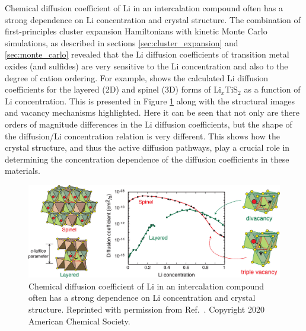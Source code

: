 \documentclass[../main.tex]{subfiles}
\begin{document}
Chemical diffusion coefficient of Li in an intercalation compound often has a strong dependence on Li concentration and crystal structure. The combination of first-principles cluster expansion Hamiltonians with kinetic Monte Carlo simulations, as described in sections \ref{sec:cluster_expansion} and \ref{sec:monte_carlo} revealed that the Li diffusion coefficients of transition metal oxides (and sulfides) are very sensitive to the Li concentration and also to the degree of cation ordering. \cite{van2008nondilute,VanderVen2001, bhattacharya2011first, bhattacharya2010phase, VanDerVen2013} For example, \citeauthor{VanderVen2020} shows the calculated Li diffusion coefficients for the layered (2D) and spinel (3D) forms of Li$_x$TiS$_2$ as a function of Li concentration. \cite{VanderVen2020,VanDerVen2013,van2008nondilute,bhattacharya2011first} This is presented in Figure \ref{fig:LixTiS2_diffusion} along with the structural images and vacancy mechanisms highlighted. Here it can be seen that not only are there orders of magnitude differences in the Li diffusion coefficients, but the shape of the diffusion/Li concentration relation is very different. This shows how the crystal structure, and thus the active diffusion pathways, play a crucial role in determining the concentration dependence of the diffusion coefficients in these materials.

\begin{figure}
    \centering
    \includegraphics[scale=0.26]{figures/LixTiS2_diffusion.jpeg}
    \caption{ Chemical diffusion coefficient of Li in an intercalation compound often has a strong dependence on Li concentration and crystal structure. Reprinted with permission from Ref.~. Copyright 2020 American Chemical Society.}
    \label{fig:LixTiS2_diffusion}
\end{figure}
\end{document}
